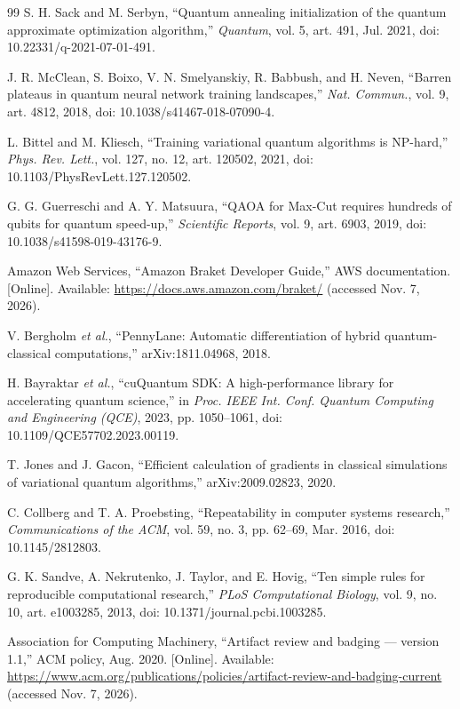 \documentclass[journal]{IEEEtran}
\begin{document}
\begin{thebibliography}{99}
 S. H. Sack and M. Serbyn, ``Quantum annealing initialization of the quantum approximate optimization algorithm,'' \textit{Quantum}, vol. 5, art. 491, Jul. 2021, doi: 10.22331/q-2021-07-01-491.

 J. R. McClean, S. Boixo, V. N. Smelyanskiy, R. Babbush, and H. Neven, ``Barren plateaus in quantum neural network training landscapes,'' \textit{Nat. Commun.}, vol. 9, art. 4812, 2018, doi: 10.1038/s41467-018-07090-4.

 L. Bittel and M. Kliesch, ``Training variational quantum algorithms is NP-hard,'' \textit{Phys. Rev. Lett.}, vol. 127, no. 12, art. 120502, 2021, doi: 10.1103/PhysRevLett.127.120502.

 G. G. Guerreschi and A. Y. Matsuura, ``QAOA for Max-Cut requires hundreds of qubits for quantum speed-up,'' \textit{Scientific Reports}, vol. 9, art. 6903, 2019, doi: 10.1038/s41598-019-43176-9.

 Amazon Web Services, ``Amazon Braket Developer Guide,'' AWS documentation. [Online]. Available: {\url{https://docs.aws.amazon.com/braket/}} (accessed Nov. 7, 2026).

 V. Bergholm \textit{et al.}, ``PennyLane: Automatic differentiation of hybrid quantum-classical computations,'' arXiv:1811.04968, 2018.

 H. Bayraktar \textit{et al.}, ``cuQuantum SDK: A high-performance library for accelerating quantum science,'' in \textit{Proc. IEEE Int. Conf. Quantum Computing and Engineering (QCE)}, 2023, pp. 1050--1061, doi: 10.1109/QCE57702.2023.00119.

 T. Jones and J. Gacon, ``Efficient calculation of gradients in classical simulations of variational quantum algorithms,'' arXiv:2009.02823, 2020.

 C. Collberg and T. A. Proebsting, ``Repeatability in computer systems research,'' \textit{Communications of the ACM}, vol. 59, no. 3, pp. 62--69, Mar. 2016, doi: 10.1145/2812803.

 G. K. Sandve, A. Nekrutenko, J. Taylor, and E. Hovig, ``Ten simple rules for reproducible computational research,'' \textit{PLoS Computational Biology}, vol. 9, no. 10, art. e1003285, 2013, doi: 10.1371/journal.pcbi.1003285.

 Association for Computing Machinery, ``Artifact review and badging --- version 1.1,'' ACM policy, Aug. 2020. [Online]. Available: {\url{https://www.acm.org/publications/policies/artifact-review-and-badging-current}} (accessed Nov. 7, 2026).


\end{thebibliography}
\end{document}
